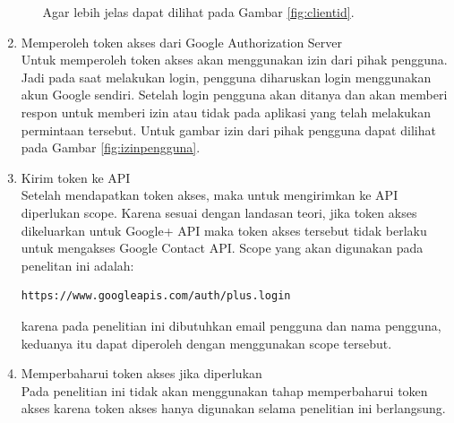 \begin{enumerate}
\begin{enumerate}
\begin{lstlisting}
\end{lstlisting}
Agar lebih jelas dapat dilihat pada Gambar \ref{fig:clientid}.
    \end{enumerate}
\item Memperoleh token akses dari Google Authorization Server\\
Untuk memperoleh token akses akan menggunakan izin dari pihak pengguna. Jadi pada saat melakukan login, pengguna diharuskan login menggunakan akun Google sendiri. Setelah login pengguna akan ditanya dan akan memberi respon untuk memberi izin atau tidak pada aplikasi yang telah melakukan permintaan tersebut. Untuk gambar izin dari pihak pengguna dapat dilihat pada Gambar \ref{fig:izinpengguna}.
\item Kirim token ke API\\
Setelah mendapatkan token akses, maka untuk mengirimkan ke API diperlukan scope. Karena sesuai dengan landasan teori, jika token akses dikeluarkan untuk Google+ API maka token akses tersebut tidak berlaku untuk mengakses Google Contact API. Scope yang akan digunakan pada penelitan ini adalah:
\begin{lstlisting}
https://www.googleapis.com/auth/plus.login
\end{lstlisting}
karena pada penelitian ini dibutuhkan email pengguna dan nama pengguna, keduanya itu dapat diperoleh dengan menggunakan scope tersebut.
\item Memperbaharui token akses jika diperlukan\\
Pada penelitian ini tidak akan menggunakan tahap memperbaharui token akses karena token akses hanya digunakan selama penelitian ini berlangsung.
\end{enumerate}

